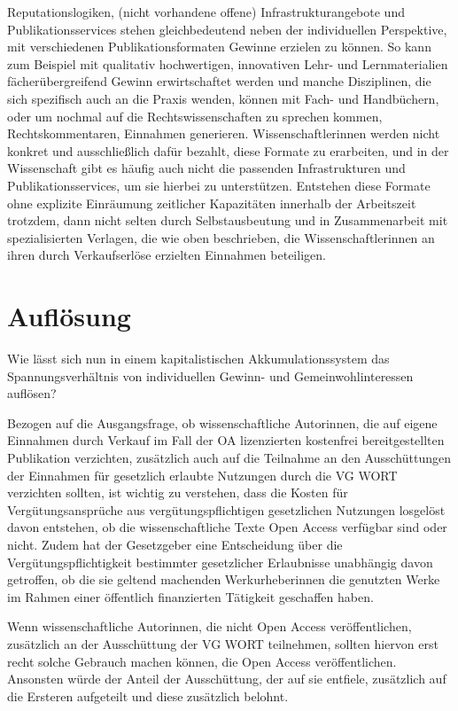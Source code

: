 \documentclass[a4paper,
fontsize=11pt,
oneside,
numbers=noperiodatend,
parskip=half-,
bibliography=totoc,
final
]{scrartcl}
\begin{document}
Reputationslogiken, (nicht vorhandene offene) Infrastrukturangebote und
Publikationsservices stehen gleichbedeutend neben der individuellen
Perspektive, mit verschiedenen Publikationsformaten Gewinne erzielen zu
können. So kann zum Beispiel mit qualitativ hochwertigen, innovativen
Lehr- und Lernmaterialien fächerübergreifend Gewinn erwirtschaftet
werden und manche Disziplinen, die sich spezifisch auch an die Praxis
wenden, können mit Fach- und Handbüchern, oder um nochmal auf die
Rechtswissenschaften zu sprechen kommen, Rechtskommentaren, Einnahmen
generieren. Wissenschaftlerinnen werden nicht konkret und ausschließlich
dafür bezahlt, diese Formate zu erarbeiten, und in der Wissenschaft gibt
es häufig auch nicht die passenden Infrastrukturen und
Publikationsservices, um sie hierbei zu unterstützen. Entstehen diese
Formate ohne explizite Einräumung zeitlicher Kapazitäten innerhalb der
Arbeitszeit trotzdem, dann nicht selten durch Selbstausbeutung und in
Zusammenarbeit mit spezialisierten Verlagen, die wie oben beschrieben,
die Wissenschaftlerinnen an ihren durch Verkaufserlöse erzielten
Einnahmen beteiligen.

\section{Auflösung}\label{aufluxf6sung}

Wie lässt sich nun in einem kapitalistischen Akkumulationssystem das
Spannungsverhältnis von individuellen Gewinn- und Gemeinwohlinteressen
auflösen?

Bezogen auf die Ausgangsfrage, ob wissenschaftliche Autorinnen, die auf
eigene Einnahmen durch Verkauf im Fall der OA lizenzierten kostenfrei
bereitgestellten Publikation verzichten, zusätzlich auch auf die
Teilnahme an den Ausschüttungen der Einnahmen für gesetzlich erlaubte
Nutzungen durch die VG WORT verzichten sollten, ist wichtig zu
verstehen, dass die Kosten für Vergütungsansprüche aus
vergütungspflichtigen gesetzlichen Nutzungen losgelöst davon entstehen,
ob die wissenschaftliche Texte Open Access verfügbar sind oder nicht.
Zudem hat der Gesetzgeber eine Entscheidung über die
Vergütungspflichtigkeit bestimmter gesetzlicher Erlaubnisse unabhängig
davon getroffen, ob die sie geltend machenden Werkurheberinnen die
genutzten Werke im Rahmen einer öffentlich finanzierten Tätigkeit
geschaffen haben.

Wenn wissenschaftliche Autorinnen, die nicht Open Access
veröffentlichen, zusätzlich an der Ausschüttung der VG WORT teilnehmen,
sollten hiervon erst recht solche Gebrauch machen können, die Open
Access veröffentlichen. Ansonsten würde der Anteil der Ausschüttung, der
auf sie entfiele, zusätzlich auf die Ersteren aufgeteilt und diese
zusätzlich belohnt.
\end{document}
